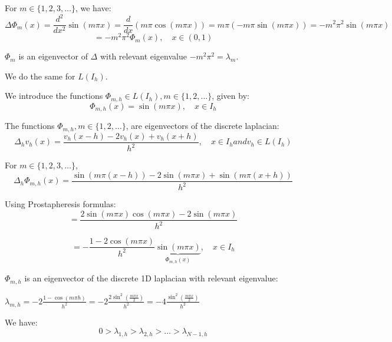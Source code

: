For $m \in \{1, 2, 3, \dots \}$, we have:
\begin{equation*}
\Delta \Phi_m(x) = \frac{d^2}{d x^2} \sin(m \pi x) = \frac{d}{dx}(m \pi \cos(m \pi x)) = m \pi (-m \pi \sin(m \pi x)) = -m^2 \pi^2 \sin(m \pi x)
\end{equation*}
\begin{equation*}
= - m^2 \pi^2 \Phi_m(x), \quad x \in (0, 1)
\end{equation*}

$\Phi_m$ is an eigenvector of $\Delta$ with relevant eigenvalue $- m^2 \pi^2 = \lambda_m$.

We do the same for $L(I_h)$.

We introduce the functions $\Phi_{m,h} \in L(I_h), m \in \{1, 2, \dots \}$, given by:
\begin{equation*}
\Phi_{m,h}(x) = \sin(m \pi x), \quad x \in I_h
\end{equation*}

The functions $\Phi_{m,h}, m \in \{1, 2, \dots \}$, are eigenvectors of the discrete laplacian:
\begin{equation*}
\Delta_h v_h(x) = \frac{v_h(x-h) - 2v_h(x) + v_h(x + h)}{h^2}, \quad x \in I_h and v_h \in L(I_h)
\end{equation*}

For $m \in \{1, 2, 3, \dots \}$,
\begin{equation*}
\Delta_h \Phi_{m,h} (x) = \frac{\sin(m \pi (x-h)) - 2 \sin (m \pi x) + \sin(m \pi (x + h))}{h^2}
\end{equation*}

Using Prostapheresis formulas:
\begin{equation*}
= \frac{2 \sin(m \pi x) \cos(m \pi x) - 2 \sin(m \pi x)}{h^2}
\end{equation*}

\begin{equation*}
= - \frac{1 - 2 \cos(m \pi x)}{h^2} \underbrace{\sin(m \pi x)}_{\Phi_{m,h}(x)}, \quad x \in I_h
\end{equation*}

$\Phi_{m,h}$ is an eigenvector of the discrete 1D laplacian with relevant eigenvalue:

$\lambda_{m, h} = -2 \frac{1 - \cos(m \pi h)}{h^2} = -2 \frac{2 \sin^2(\frac{m \pi x}{2})}{h^2} = -4 \frac{\sin^2(\frac{m \pi x}{2})}{h^2}$ 

We have:
\begin{equation*}
0 > \lambda_{1, h} > \lambda_{2, h} > \dots > \lambda_{N - 1, h}
\end{equation*}

